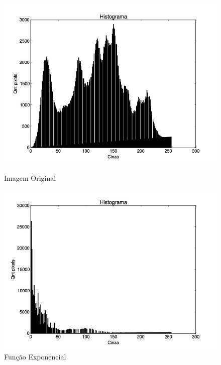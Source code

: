 \documentclass{article}
\begin{document}
\FloatBarrier
\begin{figure}[!htb]
\begin{minipage}[b]{0.45\linewidth}
\centering
\includegraphics[scale=0.25]{Histo_lena_B.jpg}
\caption{Imagem Original}
\label{fig:original}
\end{minipage}
\hspace{0.5cm}
\begin{minipage}[b]{0.45\linewidth}
\centering
\includegraphics[scale=0.25]{Histo_TransNLinearExp.jpg}
\caption{Função Exponencial}
\label{fig:rota}
\end{minipage}
\end{figure}
\FloatBarrier
\end{document}
